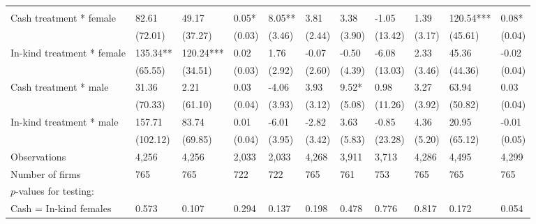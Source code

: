 \documentclass{report}
\begin{document}
\begin{table}[H]
{\begin{tabular}{lllllllllll}
\cmidrule(l{3pt}r{3pt}){2-2} \cmidrule(l{3pt}r{3pt}){3-3} \cmidrule(l{3pt}r{3pt}){4-4} \cmidrule(l{3pt}r{3pt}){5-5} \cmidrule(l{3pt}r{3pt}){6-6} \cmidrule(l{3pt}r{3pt}){7-7} \cmidrule(l{3pt}r{3pt}){8-8} \cmidrule(l{3pt}r{3pt}){9-9} \cmidrule(l{3pt}r{3pt}){10-10} \cmidrule(l{3pt}r{3pt}){11-11}
\addlinespace[0.3em]
\multicolumn{11}{l}{\textbf{Panel A: Males and females}}\\
\hspace{1em}Cash treatment * female & 82.61 & 49.17 & 0.05* & 8.05** & 3.81 & 3.38 & -1.05 & 1.39 & 120.54*** & 0.08*\\
\hspace{1em} & (72.01) & (37.27) & (0.03) & (3.46) & (2.44) & (3.90) & (13.42) & (3.17) & (45.61) & (0.04)\\
\hspace{1em}In-kind treatment * female & 135.34** & 120.24*** & 0.02 & 1.76 & -0.07 & -0.50 & -6.08 & 2.33 & 45.36 & -0.02\\
\hspace{1em} & (65.55) & (34.51) & (0.03) & (2.92) & (2.60) & (4.39) & (13.03) & (3.46) & (44.36) & (0.04)\\
\hspace{1em}Cash treatment * male & 31.36 & 2.21 & 0.03 & -4.06 & 3.93 & 9.52* & 0.98 & 3.27 & 63.94 & 0.03\\
\hspace{1em} & (70.33) & (61.10) & (0.04) & (3.93) & (3.12) & (5.08) & (11.26) & (3.92) & (50.82) & (0.04)\\
\hspace{1em}In-kind treatment * male & 157.71 & 83.74 & 0.01 & -6.01 & -2.82 & 3.63 & -0.85 & 4.36 & 20.95 & -0.01\\
\hspace{1em} & (102.12) & (69.85) & (0.04) & (3.95) & (3.42) & (5.83) & (23.28) & (5.20) & (65.12) & (0.05)\\
\hspace{1em}Observations & 4,256 & 4,256 & 2,033 & 2,033 & 4,268 & 3,911 & 3,713 & 4,286 & 4,495 & 4,299\\
\hspace{1em}Number of firms & 765 & 765 & 722 & 722 & 765 & 761 & 753 & 765 & 765 & 765\\
\hspace{1em}$p$-values for testing: &  &  &  &  &  &  &  &  &  \vphantom{1}& \\
\hspace{1em}\hspace{1em} Cash = In-kind females & 0.573 & 0.107 & 0.294 & 0.137 & 0.198 & 0.478 & 0.776 & 0.817 & 0.172 & 0.054\\

\end{tabular}}
\end{table}
\end{document}
